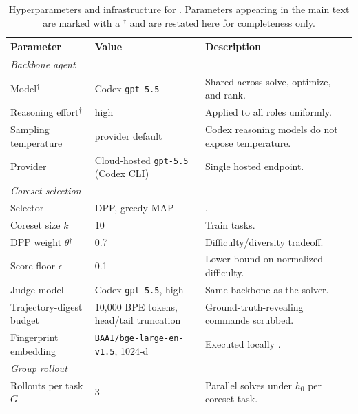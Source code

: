 \begin{table}[t]
\caption{Hyperparameters and infrastructure for \method{}. Parameters appearing in the main text are marked with a $^{\dagger}$ and are restated here for completeness only.}
\label{tab:hparams}
\centering
\small
\begin{tabular}{lll}
\toprule
\textbf{Parameter} & \textbf{Value} & \textbf{Description} \\
\midrule
\multicolumn{3}{l}{\textit{Backbone agent}} \\
\midrule
Model$^{\dagger}$           & Codex \texttt{gpt-5.5}                       & Shared across solve, optimize, and rank. \\
Reasoning effort$^{\dagger}$ & high                                        & Applied to all roles uniformly. \\
Sampling temperature        & provider default                             & Codex reasoning models do not expose temperature. \\
Provider                    & Cloud-hosted \texttt{gpt-5.5} (Codex CLI)    & Single hosted endpoint. \\
\midrule
\multicolumn{3}{l}{\textit{Coreset selection}} \\
\midrule
Selector                    & DPP, greedy MAP                              & \cite{kulesza2012dpp}. \\
Coreset size $k$$^{\dagger}$ & 10                                          & Train tasks. \\
DPP weight $\theta$$^{\dagger}$ & 0.7                                      & Difficulty/diversity tradeoff. \\
Score floor $\epsilon$      & 0.1                                          & Lower bound on normalized difficulty. \\
Judge model                 & Codex \texttt{gpt-5.5}, high                 & Same backbone as the solver. \\
Trajectory-digest budget    & 10{,}000 BPE tokens, head/tail truncation    & Ground-truth-revealing commands scrubbed. \\
Fingerprint embedding       & \texttt{BAAI/bge-large-en-v1.5}, 1024-d      & Executed locally \citep{xiao2023cpack}. \\
\midrule
\multicolumn{3}{l}{\textit{Group rollout}} \\
\midrule
Rollouts per task $G$       & 3                                            & Parallel solves under $h_0$ per coreset task. \\

\end{tabular}
\end{table}
